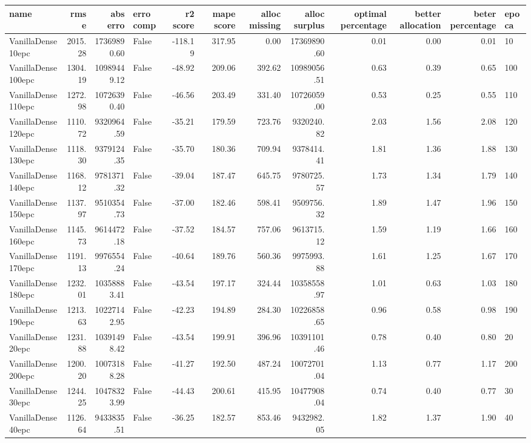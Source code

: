 \begin{tabular}{lrrlrrrrrrrl}
\toprule
name & rmse & abs erro & erro comp & r2 score & mape score & alloc missing & alloc surplus & optimal percentage & better allocation & beter percentage & epoca \\
\midrule
VanillaDense10epc & 2015.28 & 17369890.60 & False & -118.19 & 317.95 & 0.00 & 17369890.60 & 0.01 & 0.00 & 0.01 & 10 \\
VanillaDense100epc & 1304.19 & 10989449.12 & False & -48.92 & 209.06 & 392.62 & 10989056.51 & 0.63 & 0.39 & 0.65 & 100 \\
VanillaDense110epc & 1272.98 & 10726390.40 & False & -46.56 & 203.49 & 331.40 & 10726059.00 & 0.53 & 0.25 & 0.55 & 110 \\
VanillaDense120epc & 1110.72 & 9320964.59 & False & -35.21 & 179.59 & 723.76 & 9320240.82 & 2.03 & 1.56 & 2.08 & 120 \\
VanillaDense130epc & 1118.30 & 9379124.35 & False & -35.70 & 180.36 & 709.94 & 9378414.41 & 1.81 & 1.36 & 1.88 & 130 \\
VanillaDense140epc & 1168.12 & 9781371.32 & False & -39.04 & 187.47 & 645.75 & 9780725.57 & 1.73 & 1.34 & 1.79 & 140 \\
VanillaDense150epc & 1137.97 & 9510354.73 & False & -37.00 & 182.46 & 598.41 & 9509756.32 & 1.89 & 1.47 & 1.96 & 150 \\
VanillaDense160epc & 1145.73 & 9614472.18 & False & -37.52 & 184.57 & 757.06 & 9613715.12 & 1.59 & 1.19 & 1.66 & 160 \\
VanillaDense170epc & 1191.13 & 9976554.24 & False & -40.64 & 189.76 & 560.36 & 9975993.88 & 1.61 & 1.25 & 1.67 & 170 \\
VanillaDense180epc & 1232.01 & 10358883.41 & False & -43.54 & 197.17 & 324.44 & 10358558.97 & 1.01 & 0.63 & 1.03 & 180 \\
VanillaDense190epc & 1213.63 & 10227142.95 & False & -42.23 & 194.89 & 284.30 & 10226858.65 & 0.96 & 0.58 & 0.98 & 190 \\
VanillaDense20epc & 1231.88 & 10391498.42 & False & -43.54 & 199.91 & 396.96 & 10391101.46 & 0.78 & 0.40 & 0.80 & 20 \\
VanillaDense200epc & 1200.20 & 10073188.28 & False & -41.27 & 192.50 & 487.24 & 10072701.04 & 1.13 & 0.77 & 1.17 & 200 \\
VanillaDense30epc & 1244.25 & 10478323.99 & False & -44.43 & 200.61 & 415.95 & 10477908.04 & 0.74 & 0.40 & 0.77 & 30 \\
VanillaDense40epc & 1126.64 & 9433835.51 & False & -36.25 & 182.57 & 853.46 & 9432982.05 & 1.82 & 1.37 & 1.90 & 40 \\

\end{tabular}
